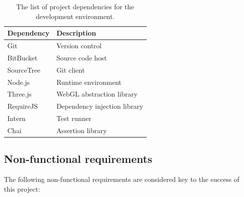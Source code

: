 \documentclass[
	fontsize=11pt
	headlines=2,
	footlines=2,
	parskip=half
]{scrartcl}
\begin{document}
{{			\begin{table}[H]
			\caption{The list of project dependencies for the development environment.}
			\label{tab:dependencies}
			\begin{tabularx}{\textwidth}{@{}XX@{}}
				\toprule
				\textbf{Dependency} & \textbf{Description} \\
				\midrule
				Git & Version control \\
				BitBucket & Source code host \\
				SourceTree & Git client \\
				Node.js & Runtime environment \\
				Three.js & WebGL abstraction library \\
				RequireJS & Dependency injection library \\
				Intern & Test runner \\
				Chai & Assertion library \\
				\bottomrule
			\end{tabularx}
			\end{table}
		
		}

		\subsection{Non-functional requirements} {

			The following non-functional requirements are considered key to the success of this project:

}}
\end{document}
